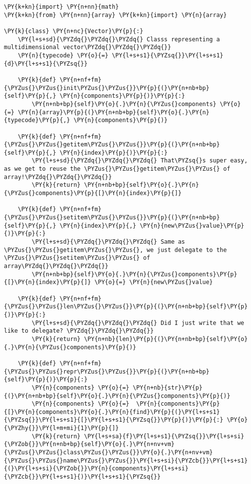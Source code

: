 \begin{Verbatim}[label=\makebox{\url{https://github.com/lucabaldini/cmepda/tree/master/slides/latex/snippets/vector\_random\_access.py}},commandchars=\\\{\}]
\PY{k+kn}{import} \PY{n+nn}{math}
\PY{k+kn}{from} \PY{n+nn}{array} \PY{k+kn}{import} \PY{n}{array}

\PY{k}{class} \PY{n+nc}{Vector}\PY{p}{:}
    \PY{l+s+sd}{\PYZdq{}\PYZdq{}\PYZdq{} Classs representing a multidimensional vector\PYZdq{}\PYZdq{}\PYZdq{}}
    \PY{n}{typecode} \PY{o}{=} \PY{l+s+s1}{\PYZsq{}}\PY{l+s+s1}{d}\PY{l+s+s1}{\PYZsq{}}

    \PY{k}{def} \PY{n+nf+fm}{\PYZus{}\PYZus{}init\PYZus{}\PYZus{}}\PY{p}{(}\PY{n+nb+bp}{self}\PY{p}{,} \PY{n}{components}\PY{p}{)}\PY{p}{:}
        \PY{n+nb+bp}{self}\PY{o}{.}\PY{n}{\PYZus{}components} \PY{o}{=} \PY{n}{array}\PY{p}{(}\PY{n+nb+bp}{self}\PY{o}{.}\PY{n}{typecode}\PY{p}{,} \PY{n}{components}\PY{p}{)}

    \PY{k}{def} \PY{n+nf+fm}{\PYZus{}\PYZus{}getitem\PYZus{}\PYZus{}}\PY{p}{(}\PY{n+nb+bp}{self}\PY{p}{,} \PY{n}{index}\PY{p}{)}\PY{p}{:}
        \PY{l+s+sd}{\PYZdq{}\PYZdq{}\PYZdq{} That\PYZsq{}s super easy, as we get to reuse the \PYZus{}\PYZus{}getitem\PYZus{}\PYZus{} of array!\PYZdq{}\PYZdq{}\PYZdq{}}
        \PY{k}{return} \PY{n+nb+bp}{self}\PY{o}{.}\PY{n}{\PYZus{}components}\PY{p}{[}\PY{n}{index}\PY{p}{]}

    \PY{k}{def} \PY{n+nf+fm}{\PYZus{}\PYZus{}setitem\PYZus{}\PYZus{}}\PY{p}{(}\PY{n+nb+bp}{self}\PY{p}{,} \PY{n}{index}\PY{p}{,} \PY{n}{new\PYZus{}value}\PY{p}{)}\PY{p}{:}
        \PY{l+s+sd}{\PYZdq{}\PYZdq{}\PYZdq{} Same as \PYZus{}\PYZus{}getitem\PYZus{}\PYZus{}, we just delegate to the \PYZus{}\PYZus{}setitem\PYZus{}\PYZus{} of array\PYZdq{}\PYZdq{}\PYZdq{}}
        \PY{n+nb+bp}{self}\PY{o}{.}\PY{n}{\PYZus{}components}\PY{p}{[}\PY{n}{index}\PY{p}{]} \PY{o}{=} \PY{n}{new\PYZus{}value}

    \PY{k}{def} \PY{n+nf+fm}{\PYZus{}\PYZus{}len\PYZus{}\PYZus{}}\PY{p}{(}\PY{n+nb+bp}{self}\PY{p}{)}\PY{p}{:}
        \PY{l+s+sd}{\PYZdq{}\PYZdq{}\PYZdq{} Did I just write that we like to delegate? \PYZdq{}\PYZdq{}\PYZdq{}}
        \PY{k}{return} \PY{n+nb}{len}\PY{p}{(}\PY{n+nb+bp}{self}\PY{o}{.}\PY{n}{\PYZus{}components}\PY{p}{)}

    \PY{k}{def} \PY{n+nf+fm}{\PYZus{}\PYZus{}repr\PYZus{}\PYZus{}}\PY{p}{(}\PY{n+nb+bp}{self}\PY{p}{)}\PY{p}{:}
        \PY{n}{components} \PY{o}{=} \PY{n+nb}{str}\PY{p}{(}\PY{n+nb+bp}{self}\PY{o}{.}\PY{n}{\PYZus{}components}\PY{p}{)}
        \PY{n}{components} \PY{o}{=}  \PY{n}{components}\PY{p}{[}\PY{n}{components}\PY{o}{.}\PY{n}{find}\PY{p}{(}\PY{l+s+s1}{\PYZsq{}}\PY{l+s+s1}{[}\PY{l+s+s1}{\PYZsq{}}\PY{p}{)}\PY{p}{:} \PY{o}{\PYZhy{}}\PY{l+m+mi}{1}\PY{p}{]}
        \PY{k}{return} \PY{l+s+sa}{f}\PY{l+s+s1}{\PYZsq{}}\PY{l+s+si}{\PYZob{}}\PY{n+nb+bp}{self}\PY{o}{.}\PY{n+nv+vm}{\PYZus{}\PYZus{}class\PYZus{}\PYZus{}}\PY{o}{.}\PY{n+nv+vm}{\PYZus{}\PYZus{}name\PYZus{}\PYZus{}}\PY{l+s+si}{\PYZcb{}}\PY{l+s+s1}{(}\PY{l+s+si}{\PYZob{}}\PY{n}{components}\PY{l+s+si}{\PYZcb{}}\PY{l+s+s1}{)}\PY{l+s+s1}{\PYZsq{}}
\end{Verbatim}
